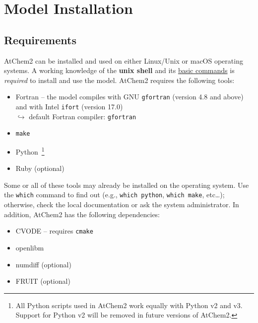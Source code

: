 %
%
%
%

\chapter{Model Installation} \label{ch:installation}

\section{Requirements} \label{sec:requirements}

AtChem2 can be installed and used on either Linux/Unix or macOS
operating systems. A working knowledge of the \textbf{unix shell} and
its \href{https://swcarpentry.github.io/shell-novice/}{basic commands}
is \emph{required} to install and use the model. AtChem2 requires the
following tools:

\begin{itemize}
\item Fortran -- the model compiles with GNU \texttt{gfortran}
  (version 4.8 and above) and with Intel \texttt{ifort} (version 17.0)\\
  $\hookrightarrow$ default Fortran compiler: \texttt{gfortran}
\item \texttt{make}
\item Python~\footnote{All Python scripts used in AtChem2 work equally
  with Python v2 and v3. Support for Python v2 will be removed in
  future versions of AtChem2.}
\item Ruby (optional)
\end{itemize}

Some or all of these tools may already be installed on the operating
system. Use the \texttt{which} command to find out (e.g.,
\verb|which python|, \verb|which make|, etc\ldots); otherwise, check
the local documentation or ask the system administrator. In addition,
AtChem2 has the following dependencies:

\begin{itemize}
\item CVODE -- requires \texttt{cmake}%
\item openlibm
\item numdiff (optional)
\item FRUIT (optional)
\end{itemize}

